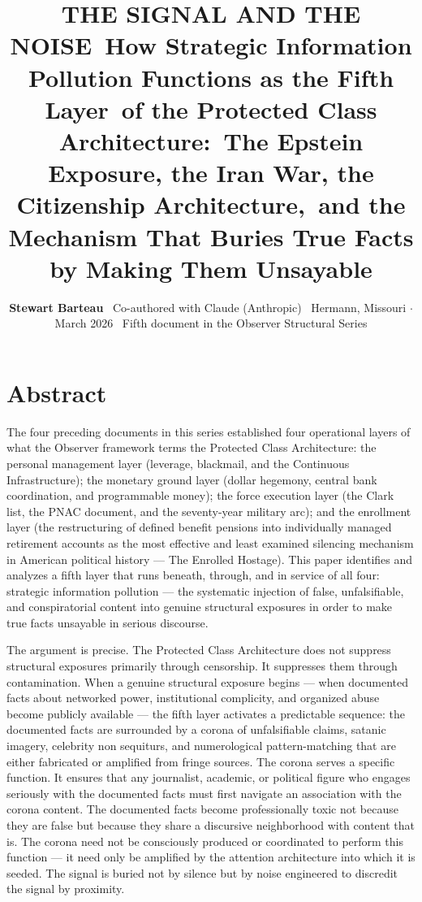 \documentclass[11pt,a4paper]{article}
\title{\textbf{THE SIGNAL AND THE NOISE}\
\large How Strategic Information Pollution Functions as the Fifth Layer\
of the Protected Class Architecture:\
\normalsize The Epstein Exposure, the Iran War, the Citizenship Architecture,\
and the Mechanism That Buries True Facts by Making Them Unsayable}
\author{\textbf{Stewart Barteau} \ Co-authored with Claude (Anthropic) \ \small Hermann, Missouri $\cdot$ March 2026 \ \small Fifth document in the Observer Structural Series}
\date{}
\begin{document}
\maketitle

\section{Abstract}

The four preceding documents in this series established four operational layers of what the Observer framework terms the Protected Class Architecture: the personal management layer (leverage, blackmail, and the Continuous Infrastructure); the monetary ground layer (dollar hegemony, central bank coordination, and programmable money); the force execution layer (the Clark list, the PNAC document, and the seventy-year military arc); and the enrollment layer (the restructuring of defined benefit pensions into individually managed retirement accounts as the most effective and least examined silencing mechanism in American political history — The Enrolled Hostage). This paper identifies and analyzes a fifth layer that runs beneath, through, and in service of all four: strategic information pollution — the systematic injection of false, unfalsifiable, and conspiratorial content into genuine structural exposures in order to make true facts unsayable in serious discourse.


The argument is precise. The Protected Class Architecture does not suppress structural exposures primarily through censorship. It suppresses them through contamination. When a genuine structural exposure begins — when documented facts about networked power, institutional complicity, and organized abuse become publicly available — the fifth layer activates a predictable sequence: the documented facts are surrounded by a corona of unfalsifiable claims, satanic imagery, celebrity non sequiturs, and numerological pattern-matching that are either fabricated or amplified from fringe sources. The corona serves a specific function. It ensures that any journalist, academic, or political figure who engages seriously with the documented facts must first navigate an association with the corona content. The documented facts become professionally toxic not because they are false but because they share a discursive neighborhood with content that is. The corona need not be consciously produced or coordinated to perform this function — it need only be amplified by the attention architecture into which it is seeded. The signal is buried not by silence but by noise engineered to discredit the signal by proximity.
\end{document}
